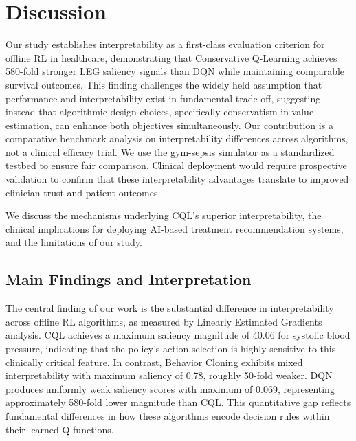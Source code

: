 
\section{Discussion}\label{sec:discussion}

Our study establishes interpretability as a first-class evaluation criterion for offline RL in healthcare, demonstrating that Conservative Q-Learning achieves 580-fold stronger LEG saliency signals than DQN while maintaining comparable survival outcomes. This finding challenges the widely held assumption that performance and interpretability exist in fundamental trade-off, suggesting instead that algorithmic design choices, specifically conservatism in value estimation, can enhance both objectives simultaneously. Our contribution is a comparative benchmark analysis on interpretability differences across algorithms, not a clinical efficacy trial. We use the gym-sepsis simulator as a standardized testbed to ensure fair comparison. Clinical deployment would require prospective validation to confirm that these interpretability advantages translate to improved clinician trust and patient outcomes.

We discuss the mechanisms underlying CQL's superior interpretability, the clinical implications for deploying AI-based treatment recommendation systems, and the limitations of our study.

\subsection{Main Findings and Interpretation}\label{sec:discussion:findings}

The central finding of our work is the substantial difference in interpretability across offline RL algorithms, as measured by Linearly Estimated Gradients analysis. CQL achieves a maximum saliency magnitude of 40.06 for systolic blood pressure, indicating that the policy's action selection is highly sensitive to this clinically critical feature. In contrast, Behavior Cloning exhibits mixed interpretability with maximum saliency of 0.78, roughly 50-fold weaker. DQN produces uniformly weak saliency scores with maximum of 0.069, representing approximately 580-fold lower magnitude than CQL. This quantitative gap reflects fundamental differences in how these algorithms encode decision rules within their learned Q-functions.

